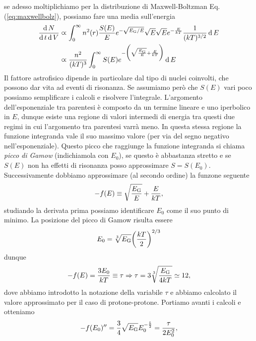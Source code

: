 se adesso moltiplichiamo per la distribuzione di Maxwell-Boltzman Eq.(\ref{eq:maxwellbolz}), possiamo fare una media sull'energia
\begin{equation*}
    \begin{split}
        \frac{\operatorname{d} N}{\operatorname{d} t \operatorname{d} V} & \varpropto \int_0^\infty n^2(r) \frac{S(E)}{E} e^{-\sqrt{E_\textup{G} / E}}\sqrt{E}\sqrt{E} e^{-\frac{E}{kT}}\frac{1}{(kT)^{3/2}} \operatorname{d} E \\
        & \varpropto \frac{n^2}{(kT)^3}\int_0^\infty S(E) e^{-\biggl(\sqrt{\frac{E_\textup{G}}{E}} + \frac{E}{kT}\biggr)} \operatorname{d} E
    \end{split}
\end{equation*}
Il fattore astrofisico dipende in particolare dal tipo di nuclei coinvolti, che possono dar vita ad eventi di risonanza. Se assumiamo però che $S(E)$ vari poco possiamo semplificare i calcoli e risolvere l'integrale. L'argomento dell'esponenziale tra parentesi è composto da un termine lineare e uno iperbolico in $E$, dunque esiste una regione di valori intermedi di energia tra questi due regimi in cui l'argomento tra parentesi varrà meno. In questa stessa regione la funzione integranda vale il suo massimo valore (per via del segno negativo nell'esponenziale). Questo picco che raggiunge la funzione integranda si chiama \emph{picco di Gamow} (indichiamola con $E_0$), se questo è abbastanza stretto e se $S(E)$ non ha effetti di risonanza posso approssimare $S = S(E_0)$. Successivamente dobbiamo approssimare (al secondo ordine) la funzone seguente
\begin{equation*}
    -f(E) \equiv \sqrt{\frac{E_\textup{G}}{E}} + \frac{E}{kT},
\end{equation*}
studiando la derivata prima possiamo identificare $E_0$ come il suo punto di minimo. La posizione del picco di Gamow risulta essere
\begin{equation*}
    E_0 = \sqrt[3]{E_\textup{G}}\biggl( \frac{kT}{2} \biggr)^{2/3}
\end{equation*}
dunque
\begin{equation*}
    -f(E) = \frac{3E_0}{kT} \equiv \tau \Rightarrow \tau = 3 \sqrt[3]{\frac{E_\textup{G}}{4kT}} \simeq 12,
\end{equation*}
dove abbiamo introdotto la notazione della variabile $\tau$ e abbiamo calcolato il valore approssimato per il caso di protone-protone. Portiamo avanti i calcoli e otteniamo
\begin{equation*}
    -f(E_0)'' = \frac{3}{4}\sqrt{E_\textup{G}} E_0^{-\frac{5}{2}} = \frac{\tau}{2E_0^2},
\end{equation*}
